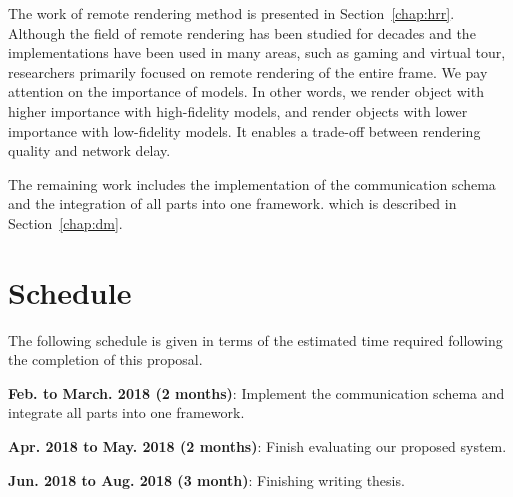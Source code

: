 The work of remote rendering method is presented in Section~\ref{chap:hrr}.
Although the field of remote rendering has been studied for decades and the implementations have been used in many areas, such as gaming and virtual tour, researchers primarily focused on remote rendering of the entire frame.
We pay attention on the importance of models. In other words, we render object with higher importance with high-fidelity models, and render objects with lower importance with low-fidelity models.
It enables a trade-off between rendering quality and network delay.

The remaining work includes the implementation of the communication schema and the integration of all parts into one framework. which is described in Section~\ref{chap:dm}.

\section{Schedule}
\label{sec:c:s}

The following schedule is given in terms of the estimated time required following the completion of this proposal.

\textbf{Feb. to March. 2018 (2 months)}: Implement the communication schema and integrate all parts into one framework.

\textbf{Apr. 2018 to May. 2018 (2 months)}: Finish evaluating our proposed system.

\textbf{Jun. 2018 to Aug. 2018 (3 month)}: Finishing writing thesis.
